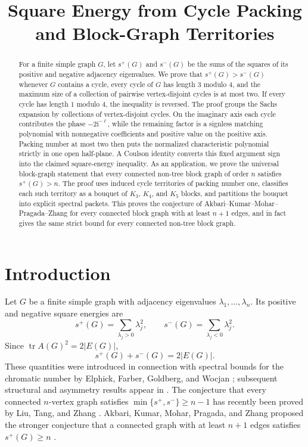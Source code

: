 \documentclass[11pt]{article}
\title{Square Energy from Cycle Packing and Block-Graph Territories}
\author{}
\date{}
\theoremstyle{definition}
\theoremstyle{remark}
\newcommand{\ii}{\mathrm{i}}
\begin{document}
\maketitle

\begin{abstract}
For a finite simple graph $G$, let $s^+(G)$ and $s^-(G)$ be the sums of
the squares of its positive and negative adjacency eigenvalues.  We prove
that $s^+(G)>s^-(G)$ whenever $G$ contains a cycle, every cycle of $G$ has
length $3$ modulo $4$, and the maximum size of a collection of pairwise
vertex-disjoint cycles is at most two.  If every cycle has length $1$ modulo $4$, the inequality
is reversed.  The proof groups the Sachs expansion by collections of
vertex-disjoint cycles.  On the imaginary axis each cycle contributes the
phase $-2\ii^{-\ell}$, while the remaining factor is a signless matching
polynomial with nonnegative coefficients and positive value on the positive
axis.  Packing number at most two then
puts the normalized characteristic polynomial strictly in one open
half-plane.  A Coulson identity converts this fixed argument sign into the
claimed square-energy inequality.  As an application, we prove the universal
block-graph statement that every connected non-tree block graph of order $n$
satisfies $s^+(G)>n$.  The proof uses induced cycle territories of packing
number one, classifies each such territory as a bouquet of $K_3$, $K_4$, and
$K_5$ blocks, and partitions the bouquet into explicit spectral packets.
This proves the conjecture of Akbari--Kumar--Mohar--Pragada--Zhang for every
connected block graph with at least $n+1$ edges, and in fact gives the same
strict bound for every connected non-tree block graph.
\end{abstract}

\section{Introduction}

Let $G$ be a finite simple graph with adjacency eigenvalues
$\lambda_1,\ldots,\lambda_n$.  Its positive and negative square energies
are
\[
 s^+(G)=\sum_{\lambda_j>0}\lambda_j^2,
 \qquad
 s^-(G)=\sum_{\lambda_j<0}\lambda_j^2.
\]
Since $\operatorname{tr}A(G)^2=2|E(G)|$,
\begin{equation}\label{eq:sum}
 s^+(G)+s^-(G)=2|E(G)|.
\end{equation}
These quantities were introduced in connection with spectral bounds for
the chromatic number by Elphick, Farber, Goldberg, and Wocjan
\cite{EFGW}; subsequent structural and asymmetry results appear in
\cite{AbiadEtAl,ElphickLinz,Zhang}.  The conjecture that every connected $n$-vertex graph
satisfies $\min\{s^+,s^-\}\ge n-1$ has recently been proved by Liu, Tang,
and Zhang \cite{LTZ}.  Akbari, Kumar, Mohar, Pragada, and Zhang proposed
the stronger conjecture that a connected graph with at least $n+1$ edges
satisfies $s^+(G)\ge n$ \cite[Conjecture 1.2]{AKMPZ}.
\end{document}
